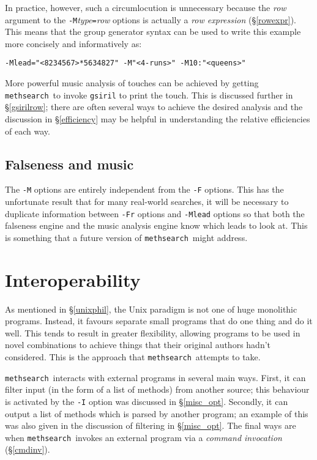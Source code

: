 \documentclass[a4paper,11pt,oneside]{book}
\makeatletter
\newcommand{\oi}[1]{\index{#1@{\hspace*{-\optwidth}\texttt{-}\texttt{#1}}}}
\def\methsearch{\texttt{meth\-search}}
\newcommand{\sref}[1]{\hyperref[#1]{\S\ref{#1}}}
\makeatother
\begin{document}
In practice, however, such a circumlocution is unnecessary because the 
\textit{row} argument to the \verb+-M+\textit{type}\verb+=+\textit{row} 
options is actually a \textit{row expression} (\sref{rowexpr}).%
This means that the group generator syntax can be used 
to write this example more concisely and informatively as:
\begin{Verbatim}
-Mlead="<8234567>*5634827" -M"<4-runs>" -M10:"<queens>"
\end{Verbatim}

More powerful music analysis of touches can be achieved by getting 
\methsearch\ to invoke \texttt{gsiril} to print the touch.  This is 
discussed further in \sref{gsirilrow}; there are often several ways to
achieve the desired analysis and the discussion in \sref{efficiency} may
be helpful in understanding the relative efficiencies of each way.

\section{Falseness and music}

The \verb+-M+ options are entirely independent from the \verb+-F+ options.
This has the unfortunate result that for many real-world searches, it will be
necessary to duplicate information between \verb+-Fr+ options and
\verb+-Mlead+ options so that both the falseness engine and the music
analysis engine know which leads to look at.  This is something that a future
version of \methsearch\ might address.


\chapter{Interoperability}\label{interop}

As mentioned in \sref{unixphil}, the Unix paradigm 
is not one of huge monolithic programs.  Instead, it favours separate
small programs that do one thing and do it well.  This tends to result in
greater flexibility, allowing programs to be used in novel combinations to
achieve things that their original authors hadn't considered.  This is
the approach that \methsearch\ attempts to take.

\methsearch\ interacts with external programs in several main ways.  First, it
can filter input (in the form of a list of methods) from another source;
this behaviour is activated by the \verb+-I+\oi{I} option was 
discussed in \sref{misc_opt}.  Secondly, it can output a list of methods
which is parsed by another program; an example of this was also given in
the discussion of filtering in \sref{misc_opt}.  The final ways are when 
\methsearch\ invokes an external program via a \textit{command invocation}
(\sref{cmdinv}).  
\end{document}
